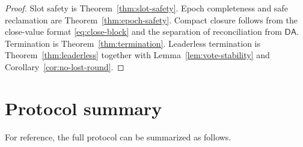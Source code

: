 \documentclass[11pt]{article}
\theoremstyle{remark}
\newcommand{\DA}{\mathsf{DA}}
\begin{document}
\begin{proof}
Slot safety is Theorem~\ref{thm:slot-safety}. Epoch completeness and safe reclamation are Theorem~\ref{thm:epoch-safety}. Compact closure follows from the close-value format \eqref{eq:close-block} and the separation of reconciliation from $\DA$. Termination is Theorem~\ref{thm:termination}. Leaderless termination is Theorem~\ref{thm:leaderless} together with Lemma~\ref{lem:vote-stability} and Corollary~\ref{cor:no-lost-round}.
\end{proof}

\section{Protocol summary}

For reference, the full protocol can be summarized as follows.
\end{document}
